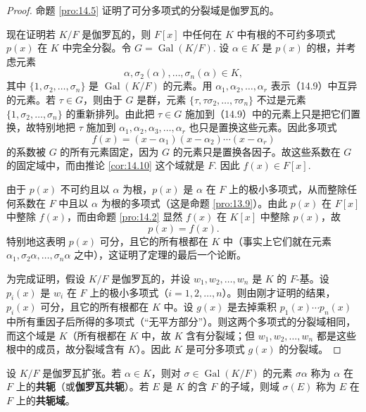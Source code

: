\begin{proof}
命题 \ref{pro:14.5} 证明了可分多项式的分裂域是伽罗瓦的。

现在证明若 \(K/F\) 是伽罗瓦的，则 \(F[x]\) 中任何在 \(K\) 中有根的不可约多项式 \(p(x)\) 在 \(K\) 中完全分裂。令 \(G = \operatorname{Gal}(K/F)\). 设 \(\alpha \in K\) 是 \(p(x)\) 的根，并考虑元素
\begin{equation}
\alpha, \sigma_2(\alpha), \ldots, \sigma_n(\alpha) \in K, \tag{14.9}
\end{equation}
其中 \(\{1, \sigma_2, \ldots, \sigma_n\}\) 是 \(\operatorname{Gal}(K/F)\) 的元素。用 \(\alpha_1, \alpha_2, \ldots, \alpha_r\) 表示（14.9）中互异的元素。若 \(\tau \in G\)，则由于 \(G\) 是群，元素 \(\{\tau, \tau\sigma_2, \ldots, \tau\sigma_n\}\) 不过是元素 \(\{1, \sigma_2, \ldots, \sigma_n\}\) 的重新排列。由此把 \(\tau \in G\) 施加到（14.9）中的元素上只是把它们置换，故特别地把 \(\tau\) 施加到 \(\alpha_1, \alpha_2, \alpha_3, \ldots, \alpha_r\) 也只是置换这些元素。因此多项式
\[
f(x) = (x-\alpha_1)(x-\alpha_2)\cdots(x-\alpha_r)
\]
的系数被 \(G\) 的所有元素固定，因为 \(G\) 的元素只是置换各因子。故这些系数在 \(G\) 的固定域中，而由推论 \ref{cor:14.10} 这个域就是 \(F\). 因此 \(f(x) \in F[x]\).

由于 \(p(x)\) 不可约且以 \(\alpha\) 为根，\(p(x)\) 是 \(\alpha\) 在 \(F\) 上的极小多项式，从而整除任何系数在 \(F\) 中且以 \(\alpha\) 为根的多项式（这是命题 \ref{pro:13.9}）。由此 \(p(x)\) 在 \(F[x]\) 中整除 \(f(x)\)，而由命题 \ref{pro:14.2} 显然 \(f(x)\) 在 \(K[x]\) 中整除 \(p(x)\)，故
\[
p(x) = f(x).
\]
特别地这表明 \(p(x)\) 可分，且它的所有根都在 \(K\) 中（事实上它们就在元素 \(\alpha_1, \sigma_2\alpha, \ldots, \sigma_n\alpha\) 之中），这证明了定理的最后一个论断。

为完成证明，假设 \(K/F\) 是伽罗瓦的，并设 \(w_1, w_2, \ldots, w_n\) 是 \(K\) 的 \(F\)-基。设 \(p_i(x)\) 是 \(w_i\) 在 \(F\) 上的极小多项式（\(i = 1, 2, \ldots, n\)）。则由刚才证明的结果，\(p_i(x)\) 可分，且它的所有根都在 \(K\) 中。设 \(g(x)\) 是去掉乘积 \(p_1(x)\cdots p_n(x)\) 中所有重因子后所得的多项式（“无平方部分”）。则这两个多项式的分裂域相同，而这个域是 \(K\)（所有根都在 \(K\) 中，故 \(K\) 含有分裂域；但 \(w_1, w_2, \ldots, w_n\) 都是这些根中的成员，故分裂域含有 \(K\)）。因此 \(K\) 是可分多项式 \(g(x)\) 的分裂域。
\end{proof}

\begin{definition}
设 \(K/F\) 是伽罗瓦扩张。若 \(\alpha \in K\)，则对 \(\sigma \in \operatorname{Gal}(K/F)\) 的元素 \(\sigma\alpha\) 称为 \(\alpha\) 在 \(F\) 上的\textbf{共轭}（或\textbf{伽罗瓦共轭}）。若 \(E\) 是 \(K\) 的含 \(F\) 的子域，则域 \(\sigma(E)\) 称为 \(E\) 在 \(F\) 上的\textbf{共轭域}。
\end{definition}

